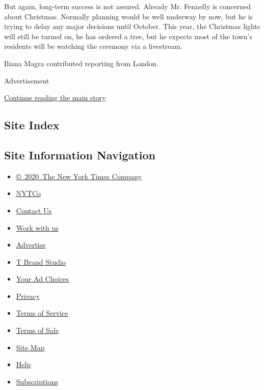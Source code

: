 But again, long-term success is not assured. Already Mr. Fennelly is
concerned about Christmas. Normally planning would be well underway by
now, but he is trying to delay any major decisions until October. This
year, the Christmas lights will still be turned on, he has ordered a
tree, but he expects most of the town's residents will be watching the
ceremony via a livestream.

Iliana Magra contributed reporting from London.

Advertisement

\protect\hyperlink{after-bottom}{Continue reading the main story}

\hypertarget{site-index}{%
\subsection{Site Index}\label{site-index}}

\hypertarget{site-information-navigation}{%
\subsection{Site Information
Navigation}\label{site-information-navigation}}

\begin{itemize}
\tightlist
\item
  \href{https://help.nytimes.com/hc/en-us/articles/115014792127-Copyright-notice}{©~2020~The
  New York Times Company}
\end{itemize}

\begin{itemize}
\tightlist
\item
  \href{https://www.nytco.com/}{NYTCo}
\item
  \href{https://help.nytimes.com/hc/en-us/articles/115015385887-Contact-Us}{Contact
  Us}
\item
  \href{https://www.nytco.com/careers/}{Work with us}
\item
  \href{https://nytmediakit.com/}{Advertise}
\item
  \href{http://www.tbrandstudio.com/}{T Brand Studio}
\item
  \href{https://www.nytimes.com/privacy/cookie-policy\#how-do-i-manage-trackers}{Your
  Ad Choices}
\item
  \href{https://www.nytimes.com/privacy}{Privacy}
\item
  \href{https://help.nytimes.com/hc/en-us/articles/115014893428-Terms-of-service}{Terms
  of Service}
\item
  \href{https://help.nytimes.com/hc/en-us/articles/115014893968-Terms-of-sale}{Terms
  of Sale}
\item
  \href{https://spiderbites.nytimes.com}{Site Map}
\item
  \href{https://help.nytimes.com/hc/en-us}{Help}
\item
  \href{https://www.nytimes.com/subscription?campaignId=37WXW}{Subscriptions}
\end{itemize}

